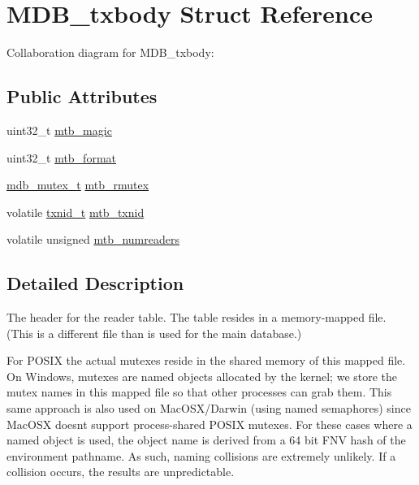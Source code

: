 \hypertarget{struct_m_d_b__txbody}{}\section{M\+D\+B\+\_\+txbody Struct Reference}
\label{struct_m_d_b__txbody}


Collaboration diagram for M\+D\+B\+\_\+txbody\+:
\subsection*{Public Attributes}
\begin{DoxyCompactItemize}
\item 
uint32\+\_\+t \mbox{\hyperlink{struct_m_d_b__txbody_ada53ed82f4a10575e96a6d2e48da3c9a}{mtb\+\_\+magic}}
\item 
uint32\+\_\+t \mbox{\hyperlink{struct_m_d_b__txbody_aad8e50c2b4e26c5aba42ec028f43d939}{mtb\+\_\+format}}
\item 
\mbox{\hyperlink{group__compat_ga9b7b61d0ad68b601d11d93e5c1193391}{mdb\+\_\+mutex\+\_\+t}} \mbox{\hyperlink{struct_m_d_b__txbody_a75967346ee7bfa5375b274970aeca917}{mtb\+\_\+rmutex}}
\item 
volatile \mbox{\hyperlink{group__internal_gabbaef7c9c710f8652a62c32d748c040e}{txnid\+\_\+t}} \mbox{\hyperlink{struct_m_d_b__txbody_afa59f10a949b2bfb9a7107fb80b7bc48}{mtb\+\_\+txnid}}
\item 
volatile unsigned \mbox{\hyperlink{struct_m_d_b__txbody_a64a149ee48c8290e884c052a54696c9a}{mtb\+\_\+numreaders}}
\end{DoxyCompactItemize}


\subsection{Detailed Description}
The header for the reader table. The table resides in a memory-\/mapped file. (This is a different file than is used for the main database.)

For P\+O\+S\+IX the actual mutexes reside in the shared memory of this mapped file. On Windows, mutexes are named objects allocated by the kernel; we store the mutex names in this mapped file so that other processes can grab them. This same approach is also used on Mac\+O\+S\+X/\+Darwin (using named semaphores) since Mac\+O\+SX doesn\textquotesingle{}t support process-\/shared P\+O\+S\+IX mutexes. For these cases where a named object is used, the object name is derived from a 64 bit F\+NV hash of the environment pathname. As such, naming collisions are extremely unlikely. If a collision occurs, the results are unpredictable. 

